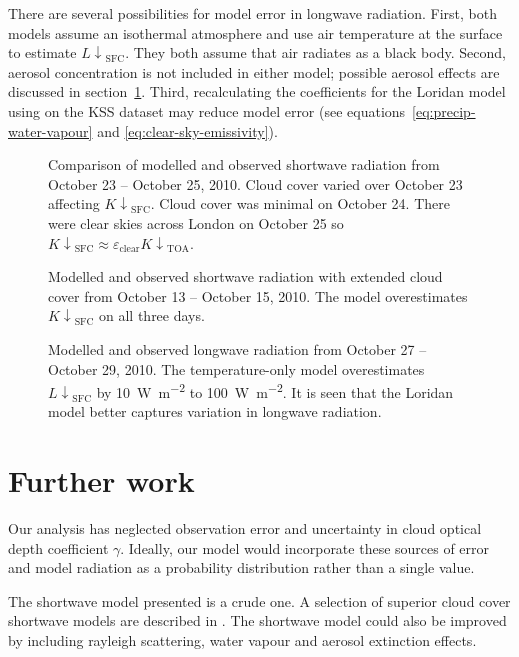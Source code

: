 \documentclass[a4paper,titlepage, twoside]{report}
\newcommand\Kdownsfc{{K\!\!\downarrow}_\mathrm{SFC}}
\newcommand\Kdowntoa{{K\!\!\downarrow}_\mathrm{TOA}}
\newcommand\Ldownsfc{{L\!\!\downarrow}_\mathrm{SFC}}
\begin{document}
There are several possibilities for model error in longwave radiation.  First, both models assume an isothermal atmosphere and use air temperature at the surface to estimate $\Ldownsfc$.  They both assume that air radiates as a black body.  Second, aerosol concentration is not included in either model; possible aerosol effects are discussed in section~\ref{sec:further-work}.  Third, recalculating the coefficients for the Loridan model using on the KSS dataset may reduce model error (see equations~\ref{eq:precip-water-vapour} and \ref{eq:clear-sky-emissivity}).
\begin {figure}
\centering

\caption{Comparison of modelled and observed shortwave radiation from October 23 -- October 25, 2010.  Cloud cover varied over October 23 affecting $\Kdownsfc$.  Cloud cover was minimal on October 24.  There were clear skies across London on October 25 so $\Kdownsfc \approx \varepsilon_\mathrm{clear} \Kdowntoa$.}
\label{fig:shortwave-verification}
\end{figure}

\begin{figure}
\centering

\caption{Modelled and observed shortwave radiation with extended cloud cover from October 13 -- October 15, 2010.  The model overestimates $\Kdownsfc$ on all three days.}
\label{fig:extended-cloud}
\end{figure}

\begin{figure}
\centering

\caption{Modelled and observed longwave radiation from October 27 -- October 29, 2010.  The temperature-only model overestimates $\Ldownsfc$ by \SI{10}{\watt\per\meter\squared} to \SI{100}{\watt\per\meter\squared}.  It is seen that the Loridan model better captures variation in longwave radiation.}
\label{fig:longwave-verification}
\end{figure}

\section{Further work}
\label{sec:further-work}
Our analysis has neglected observation error and uncertainty in cloud optical depth coefficient $\gamma$.  Ideally, our model would incorporate these sources of error and model radiation as a probability distribution rather than a single value.

The shortwave model presented is a crude one.  A selection of superior cloud cover shortwave models are described in \cite{ingram}.  The shortwave model could also be improved by including rayleigh scattering, water vapour and aerosol extinction effects.
\end{document}
